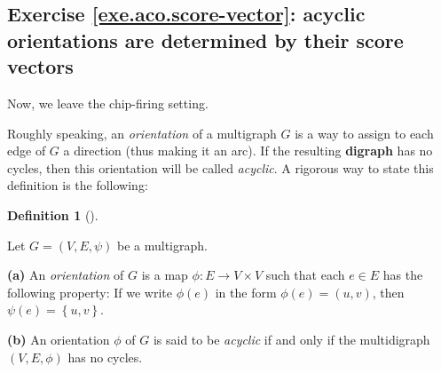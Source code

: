 \documentclass[numbers=enddot,12pt,final,onecolumn,notitlepage]{scrartcl}%
\theoremstyle{definition}
\newtheorem{defi}[theo]{Definition}
\newenvironment{definition}[1][]
{\begin{defi}[#1]\begin{leftbar}}
{\end{leftbar}\end{defi}}
\newcommand{\set}[1]{\left\{ #1 \right\}}
\newcommand{\tup}[1]{\left( #1 \right)}
\begin{document}
\subsection{Exercise \ref{exe.aco.score-vector}: acyclic
orientations are determined by their score vectors}

Now, we leave the chip-firing setting.

Roughly speaking, an \textit{orientation} of
a multigraph $G$ is a way to assign to each edge of $G$
a direction (thus making it an arc).
If the resulting \textbf{digraph} has no cycles, then
this orientation will be called \textit{acyclic}.
A rigorous way to state this definition is the
following:

\begin{definition} \label{def.aco.aco}
Let $G = \tup{V, E, \psi}$ be a multigraph.

\textbf{(a)} An \textit{orientation} of $G$ is a map
$\phi : E \to V \times V$ such that each $e \in E$
has the following property:
If we write $\phi \tup{e}$ in the form
$\phi \tup{e} = \tup{u, v}$, then
$\psi \tup{e} = \set{u, v}$.

\textbf{(b)} An orientation $\phi$ of $G$ is said to
be \textit{acyclic} if and only if the multidigraph
$\tup{V, E, \phi}$ has no cycles.
\end{definition}
\end{document}

